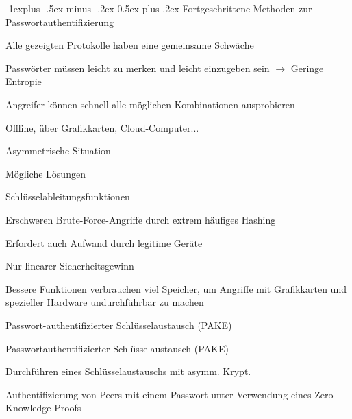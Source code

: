 \documentclass[a4paper]{article}
\makeatletter
\renewcommand{\subsection}{\@startsection{subsection}{2}{0mm}%
 {-1explus -.5ex minus -.2ex}%
 {0.5ex plus .2ex}%
 {\normalfont\normalsize\bfseries}}
\makeatother
\begin{document}
\begin{multicols}{3}
      \subsection{Fortgeschrittene Methoden zur Passwortauthentifizierung}
      \begin{itemize*}
            \item Alle gezeigten Protokolle haben eine gemeinsame Schwäche
            \begin{itemize*}
                  \item Passwörter müssen leicht zu merken und leicht einzugeben sein $\rightarrow$ Geringe Entropie
                  \item Angreifer können schnell alle möglichen Kombinationen ausprobieren
                  \item Offline, über Grafikkarten, Cloud-Computer...
                  \item Asymmetrische Situation
            \end{itemize*}
            \item Mögliche Lösungen
            \begin{itemize*}
                  \item Schlüsselableitungsfunktionen
                  \begin{itemize*}
                        \item Erschweren Brute-Force-Angriffe durch extrem häufiges Hashing
                        \item Erfordert auch Aufwand durch legitime Geräte
                        \item Nur linearer Sicherheitsgewinn
                        \item Bessere Funktionen verbrauchen viel Speicher, um Angriffe mit Grafikkarten und spezieller Hardware undurchführbar zu machen
                  \end{itemize*}
                  \item Passwort-authentifizierter Schlüsselaustausch (PAKE)
            \end{itemize*}
            \item Passwortauthentifizierter Schlüsselaustausch (PAKE)
            \begin{itemize*}
                  \item Durchführen eines Schlüsselaustauschs mit asymm. Krypt.
                  \item Authentifizierung von Peers mit einem Passwort unter Verwendung eines Zero Knowledge Proofs

\end{itemize*}
\end{itemize*}
\end{multicols}
\end{document}
